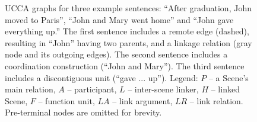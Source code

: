 \documentclass[11pt]{article}
\begin{document}
\begin{figure}
\begin{subfigure}[t]{.5\textwidth}
{
  }
  \caption{}
  \label{fig:gave}
  \end{subfigure}
  \label{fig:examples}
  \caption{\small
  UCCA graphs for three example sentences:
  ``After graduation, John moved to Paris'',
  ``John and Mary went home''
  and ``John gave everything up.''
  The first sentence includes a remote edge (dashed),
  resulting in ``John'' having two parents, and
  a linkage relation (gray node and its outgoing edges).
  The second sentence includes a coordination construction (``John and Mary'').
  The third sentence includes a discontiguous unit (``gave ... up'').
  Legend: $P$ -- a Scene's main relation, $A$ -- participant,
  $L$ -- inter-scene linker, $H$ -- linked Scene, $F$ -- function unit,
  $LA$ -- link argument, $LR$ -- link relation.
  Pre-terminal nodes are omitted for brevity.
}
\end{figure}
\end{document}
